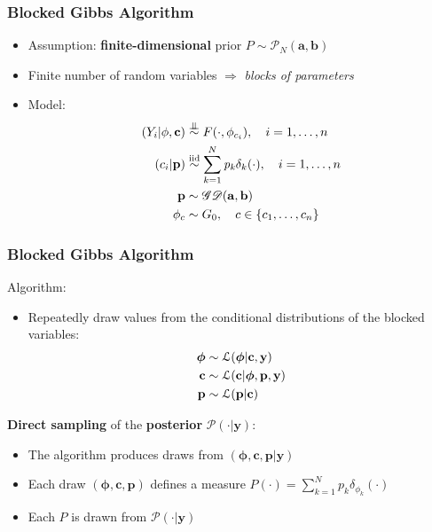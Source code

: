 \begin{frame}
	\frametitle{Blocked Gibbs Algorithm}
	\begin{itemize}
	    \item Assumption: \textbf{finite-dimensional} prior $P \sim  \mathscr{P}_{N}(\mathbf{a},\mathbf{b})$
        \item Finite number of random variables $\Rightarrow$ \textit{blocks of parameters}
        \item Model:
        \begin{align*}
            (Y_{i}|\mathbf{\phi},\mathbf{c})&\indsim F(\cdot,\phi_{c_{i}}), \quad i=1,\dots,n \\
            (c_{i}|\mathbf{p})&\iidsim\sum\limits_{k=1}^N \mathit{p_{k}}\delta_{k}(\cdot), \quad i=1,\dots,n \\
            \mathbf{p} &\sim \mathscr{GD}(\mathbf{a},\mathbf{b}) \\
            \mathbf{\phi}_{c} & \sim G_{0}, \quad c \in \{c_1,\dots, c_n\}
        \end{align*}



	\end{itemize}
\end{frame}




\begin{frame}
	\frametitle{Blocked Gibbs Algorithm}
	Algorithm:
	\begin{itemize}
		\item Repeatedly draw values from the conditional distributions of the blocked variables:
		\begin{align*}
			\boldsymbol\phi &\sim \mathcal L(\boldsymbol\phi | \mathbf{c}, \mathbf{y}) \\
			\mathbf{c} &\sim \mathcal L (\mathbf{c}| \boldsymbol\phi,\mathbf{p}, \mathbf{y}) \\
			\mathbf{p} &\sim \mathcal L (\mathbf{p}| \mathbf{c})
		\end{align*}
	\end{itemize}
	\textbf{Direct sampling} of the \textbf{posterior} $\mathscr{P}(\cdot|\mathbf{y})$:
	\begin{itemize}
    	\item The algorithm produces draws from $(\boldsymbol\phi,\mathbf{c},\mathbf{p}| \mathbf{y})$
		\item Each draw $(\boldsymbol\phi,\mathbf{c},\mathbf{p})$ defines a measure $P(\cdot)= \sum\limits_{k=1}^N  \mathit{p_{k}}\delta_{\phi_{k}}(\cdot) $ %
		\item Each $P$ is drawn from $\mathscr{P}(\cdot|\mathbf{y})$
	\end{itemize}
\end{frame}

